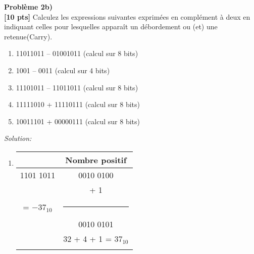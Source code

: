 \documentclass{article}
\newenvironment{problem}[2][Problème]
    { \begin{mdframed}[backgroundcolor=gray!20] \textbf{#1 #2} \\}
    {  \end{mdframed}}
\newenvironment{solution}
    {\textit{Solution:}}
    {}
\begin{document}
\begin{problem}{2b)}
\textbf{[10 pts]} Calculez les expressions suivantes exprimées en complément à deux en indiquant
celles pour lesquelles apparaît un débordement ou (et) une retenue(Carry).
\begin{enumerate}
    \item 11011011 – 01001011 (calcul sur 8 bits)
    \item 1001 – 0011 (calcul sur 4 bits)
    \item 11101011 – 11011011 (calcul sur 8 bits)
    \item 11111010 + 11110111 (calcul sur 8 bits)
    \item 10011101 + 00000111 (calcul sur 8 bits)
\end{enumerate}
\end{problem}
\begin{solution}
    \begin{enumerate}
        \item
        
        
        \begin{tabular}{|c|c|}
        \hline
         & Nombre positif\\
        \hline    
        1101 1011           &       0010 0100                   \\
        \hspace{101pt}      &       + \hspace{25pt} 1           \\
        = $-37_{10}$        &       \rule{1in}{1pt}             \\
        \hspace{5pt}        &       0010 0101                   \\
        \hspace{5pt}        &       32 + 4 + 1 = $37_{10}$      \\
                            &       \hspace{100pt}              \\
        \hline
        \end{tabular}
        
        \hspace{40pt}
        

\end{enumerate}
\end{solution}
\end{document}
